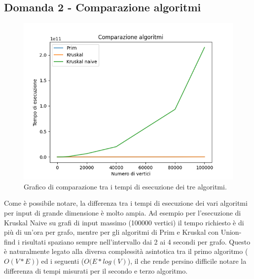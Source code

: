 \subsection{Domanda 2 - Comparazione algoritmi}
\begin{figure}[H]
	\centering
	\includegraphics[width=1\linewidth]{"../graphs/algo"}
	\caption{Grafico di comparazione tra i tempi di esecuzione dei tre algoritmi.}
	\label{fig:comparison-graph}
\end{figure}
Come è possibile notare, la differenza tra i tempi di esecuzione dei vari algoritmi per input di grande dimensione è molto ampia. Ad esempio per l'esecuzione di Kruskal Naive su grafi di input massimo (100000 vertici) il tempo richiesto è di più di un'ora per grafo, mentre per gli algoritmi di Prim e Kruskal con Union-find i risultati spaziano sempre nell'intervallo dai 2 ai 4 secondi per grafo. Questo è naturalmente legato alla diversa complessità asintotica tra il primo algoritmo ($O(V*E)$) ed i seguenti ($O(E*log(V)$), il che rende persino difficile notare la differenza di tempi misurati per il secondo e terzo algoritmo.

